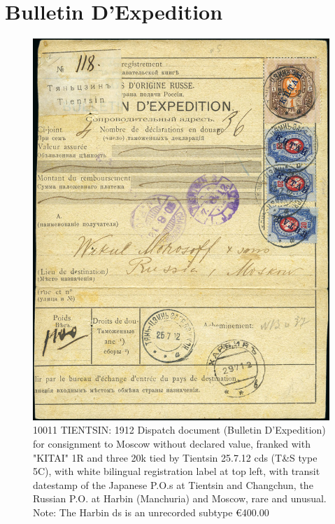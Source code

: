 \section{Bulletin D'Expedition}

\begin{figure}[htbp]
\centering
\includegraphics[width=.95\textwidth]{../russian-post-offices-in-china/10011.jpg}
\caption{
10011 TIENTSIN: 1912 Dispatch document (Bulletin D'Expedition) for consignment to
Moscow without declared value, franked with "KITAI" 1R and three 20k tied by 
Tientsin 25.7.12 cds (T\&S type 5C), with white bilingual registration label 
at top left, with transit datestamp of the Japanese P.O.s at Tientsin and Changchun, 
the Russian P.O. at Harbin (Manchuria) and Moscow, rare and unusual.
Note: The Harbin ds is an unrecorded subtype
\euro 400.00
}  
\end{figure}

